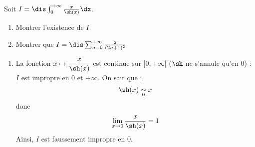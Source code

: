 \documentclass[a4paper,10pt]{report}
\begin{document}
\begin{Exa}\label{gamma} Soit $I = \dis \int_{0}^{+ \infty} \frac{x}{\sh(x)} \dx$.

\begin{enumerate}
\item Montrer l'existence de $I$.
\item Montrer que $I= \dis \sum_{n=0}^{+ \infty} \frac{2}{(2n+1)^2}\cdot$
\end{enumerate}
\end{Exa} 

\corr 

\begin{enumerate}
\item La fonction $x \mapsto \dfrac{x}{\sh(x)}$ est continue sur $]0, + \infty[$ ($\sh$ ne s'annule qu'en $0$) : $I$ est impropre en $0$ et $+ \infty$. On sait que :
$$ \sh(x) \underset{0}{\sim} x$$
donc 
$$ \lim_{x \rightarrow 0} \dfrac{x}{\sh(x)} = 1$$
Ainsi, $I$ est faussement impropre en $0$. 

\medskip


\end{enumerate}
\end{document}
